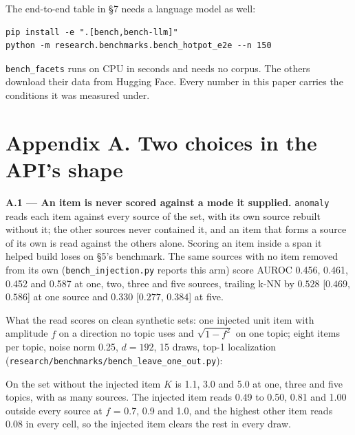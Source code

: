 \documentclass[10pt,letterpaper,twocolumn]{article}
\begin{document}
The end-to-end table in §7 needs a language model as well:

\begin{verbatim}
pip install -e ".[bench,bench-llm]"
python -m research.benchmarks.bench_hotpot_e2e --n 150
\end{verbatim}

\texttt{bench\_\allowbreak{}facets} runs on CPU in seconds and needs no corpus. The others download their data from
Hugging Face. Every number in this paper carries the conditions it was measured under.

\section{Appendix A. Two choices in the API's shape}\label{appendix-a-two-choices-in-the-apis-shape}

\textbf{A.1 --- An item is never scored against a mode it supplied.} \texttt{anomaly} reads each item against
every source of the set, with its own source rebuilt without it; the other sources never
contained it, and an item that forms a source of its own is read against the others alone.
Scoring an item inside a span it helped build loses on §5's benchmark. The same sources with no
item removed from its own (\texttt{bench\_\allowbreak{}injection.\allowbreak{}py} reports this arm) score AUROC 0.456, 0.461,
0.452 and 0.587 at one, two, three and five sources, trailing k-NN by \(0.528\) {[}\(0.469\), \(0.586\){]}
at one source and \(0.330\) {[}\(0.277\), \(0.384\){]} at five.

What the read scores on clean synthetic sets: one injected unit item with amplitude \(f\) on a
direction no topic uses and \(\sqrt{1 - f^2}\) on one topic; eight items per topic, noise norm
0.25, \(d = 192\), 15 draws, top-1 localization (\texttt{research/\allowbreak{}benchmarks/\allowbreak{}bench\_\allowbreak{}leave\_\allowbreak{}one\_\allowbreak{}out.\allowbreak{}py}):


On the set without the injected item \(K\) is 1.1, 3.0 and 5.0 at one, three and five topics, with
as many sources. The injected item reads 0.49 to 0.50, 0.81 and 1.00 outside every source at \(f\)
= 0.7, 0.9 and 1.0, and the highest other item reads 0.08 in every cell, so the injected item
clears the rest in every draw.
\end{document}
